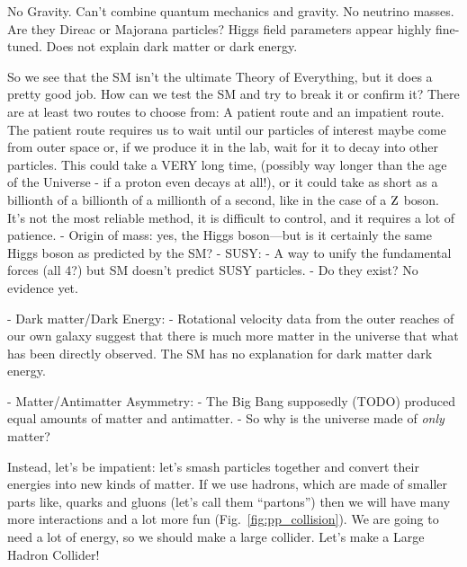 No Gravity. Can't combine quantum mechanics and gravity.
No neutrino masses. Are they Direac or Majorana particles?
Higgs field parameters appear highly fine-tuned.
Does not explain dark matter or dark energy.

So we see that the SM isn't the ultimate Theory of Everything, but it does a pretty good job. 
How can we test the SM and try to break it or confirm it?
There are at least two routes to choose from:
A patient route and an impatient route.
The patient route requires us to wait until our particles of interest
maybe come from outer space or, if we produce it in the lab, 
wait for it to decay into other particles. 
This could take a VERY long time, (possibly way longer than the age of the Universe - if a proton even decays at all!),
or it could take as short as a billionth of a billionth of a millionth of a second, 
like in the case of a ${\rm Z}$ boson.
It's not the most reliable method, it is difficult to control, and it requires a lot of patience.
- Origin of mass: yes, the Higgs boson---but is it certainly the same Higgs boson as predicted by the SM?
- SUSY:
    - A way to unify the fundamental forces (all 4?) but SM doesn't predict SUSY particles.
    - Do they exist? No evidence yet.

- Dark matter/Dark Energy:
    - Rotational velocity data from the outer reaches of our own galaxy suggest that there is much more matter in the universe that what has been directly observed.
    The SM has no explanation for dark matter dark energy.

- Matter/Antimatter Asymmetry:
    - The Big Bang supposedly (TODO) produced equal amounts of matter and antimatter.
    - So why is the universe made of \emph{only} matter?


Instead, let's be impatient: 
let's smash particles together and convert their energies into new kinds of matter. 
If we use hadrons, which are made of smaller parts like, quarks and gluons 
(let's call them ``partons'') then we will have many more interactions and a lot more fun (Fig.~\ref{fig:pp_collision}).
We are going to need a lot of energy, so we should make a large collider. 
Let's make a Large Hadron Collider!

